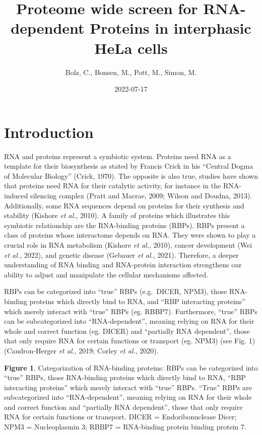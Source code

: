 \documentclass[
]{article}
\title{Proteome wide screen for RNA-dependent Proteins in interphasic
HeLa cells}
\author{Bolz, C., Bonsen, M., Pott, M., Simon, M.}
\date{2022-07-17}
\begin{document}
\maketitle

\hypertarget{introduction}{%
\section{Introduction}\label{introduction}}

RNA and proteins represent a symbiotic system. Proteins need RNA as a
template for their biosynthesis as stated by Francis Crick in his
``Central Dogma of Molecular Biology'' (Crick, 1970). The opposite is
also true, studies have shown that proteins need RNA for their catalytic
activity, for instance in the RNA-induced silencing complex (Pratt and
Macrae, 2009; Wilson and Doudna, 2013). Additionally, some RNA sequences
depend on proteins for their synthesis and stability (Kishore \emph{et
al.}, 2010). A family of proteins which illustrates this symbiotic
relationship are the RNA-binding proteins (RBPs). RBPs present a class
of proteins whose interactome depends on RNA. They were shown to play a
crucial role in RNA metabolism (Kishore \emph{et al.}, 2010), cancer
development (Wei \emph{et al.}, 2022), and genetic disease (Gebauer
\emph{et al.}, 2021). Therefore, a deeper understanding of RNA binding
and RNA-protein interaction strengthens our ability to adjust and
manipulate the cellular mechanisms affected.

RBPs can be categorized into ``true'' RBPs (e.g.~DICER, NPM3), those
RNA-binding proteins which directly bind to RNA, and ``RBP interacting
proteins'' which merely interact with ``true'' RBPs (eg. RBBP7).
Furthermore, ``true'' RBPs can be subcategorized into ``RNA-dependent'',
meaning relying on RNA for their whole and correct function (eg. DICER)
and ``partially RNA dependent'', those that only require RNA for certain
functions or transport (eg. NPM3) (see Fig. 1) (Caudron-Herger \emph{et
al.}, 2019; Corley \emph{et al.}, 2020).

\textbf{Figure 1}. Categorization of RNA-binding proteins: RBPs can be
categorized into ``true'' RBPs, those RNA-binding proteins which
directly bind to RNA, ``RBP interacting proteins'' which merely interact
with ``true'' RBPs. ``True'' RBPs are subcategorized into
``RNA-dependent'', meaning relying on RNA for their whole and correct
function and ``partially RNA dependent'', those that only require RNA
for certain functions or transport. DICER = Endoribonuclease Dicer; NPM3
= Nucleoplasmin 3; RBBP7 = RNA-binding protein binding protein 7.
\end{document}
